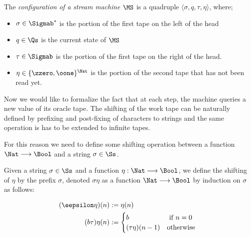 \begin{conditional}{\notappendix}
    \begin{defn}
      \label{def:smconf}
    The \emph{configuration of a stream machine $\MS$}
    is a quadruple $\langle \sigma, q, \tau, \eta\rangle$,
    where;
    \begin{itemize}
    \itemsep0em
    \item $\sigma\in \Sigmab^*$
    is the portion of the first tape on the left
    of the head
    \item $q\in \Qs$ is the current state of $\MS$
    \item $\tau\in \Sigmab$ is the portion of the first
    tape on the right of the head.
    \item $\eta \in \{\zzero,\oone\}^{\Nat}$
    is the portion of the second tape that has not been read yet.
    \end{itemize}
    \end{defn}


    Now we would like to formalize the fact that at each step,
    the machine queries a new value of its oracle tape.
    The shifting of the work tape can be naturally defined
    by prefixing and post-fixing of characters to strings and the same operation
    is has to be extended to infinite tapes.

    For this reason we need to define some shifting operation between
    a function $\Nat \longrightarrow \Bool$ and a string $\sigma \in \Ss$.

    \begin{defn}
      \label{def:shifting}
      Given a string $\sigma \in \Ss$ and a function
      $\eta: \Nat \longrightarrow \Bool$, we define the shifting of $\eta$
      by the prefix $\sigma$, denoted $\sigma\eta$ as a function
      $\Nat \longrightarrow \Bool$ by induction on $\sigma$
      as follows:

      \begin{align*}
      (\eepsilon \eta)(n) &:= \eta(n)\\
      (b\tau)\eta(n) &:= \begin{cases}
                          b & \text{ if } n = 0\\
                          (\tau\eta)(n-1) & \text{otherwise}\\
                        \end{cases}
      \end{align*}

    \end{defn}


\end{conditional}
